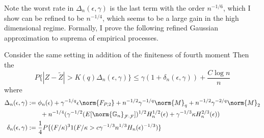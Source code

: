 \documentclass[uplatex,dvipdfmx]{jsarticle}
\begin{document}
Note the worst rate in $\Delta_n(\epsilon, \gamma )$ is the last term with the order $n^{-1/6}$, which I show can be refined to be $n^{-1/4}$, which seems to be a large gain in the high dimensional regime. Formally, I prove the following refined Gaussian approximation to suprema of empirical processes.
\begin{theorem}
    Consider the same setting in addition of the finiteness of fourth moment \koko 
    Then the
    \[P\{ | Z - \tilde{Z}| > K(q) \Delta _n ( \epsilon, \gamma ) \}  \leq \gamma ( 1 + \delta_n (\epsilon , \gamma )) + \frac{ C \log n}{n}\]
    where
    \begin{align*}
        \Delta_n (\epsilon, \gamma )&: = \phi_n ( \epsilon) + \gamma ^{ -1/q} \epsilon \norm{F_{P,2}} + n^{-1/2} \gamma ^{-1/q} \norm{M}_q + n^{-1/2} \gamma^{-2/q} \norm{M}_2\\
        &\qquad+ n^{-1/4} ( \gamma^{-1/2} ( E[ \norm{\mathbb{G}_n}_{ \mathcal{F}\cdot \mathcal{F}}])^{1/2} H_n^{1/2} ( \epsilon) + \gamma^{-1/3} \kappa H_n ^{2/3} ( \epsilon))\\
        \delta_n ( \epsilon, \gamma )&:= \frac{1}{4} P \{ (F/\kappa)^3 1( F/ \kappa > c \gamma ^{-1/3}n^{1/3}H_n ( \epsilon)^{-1/3}) \}
    \end{align*}
\end{theorem}
\end{document}
